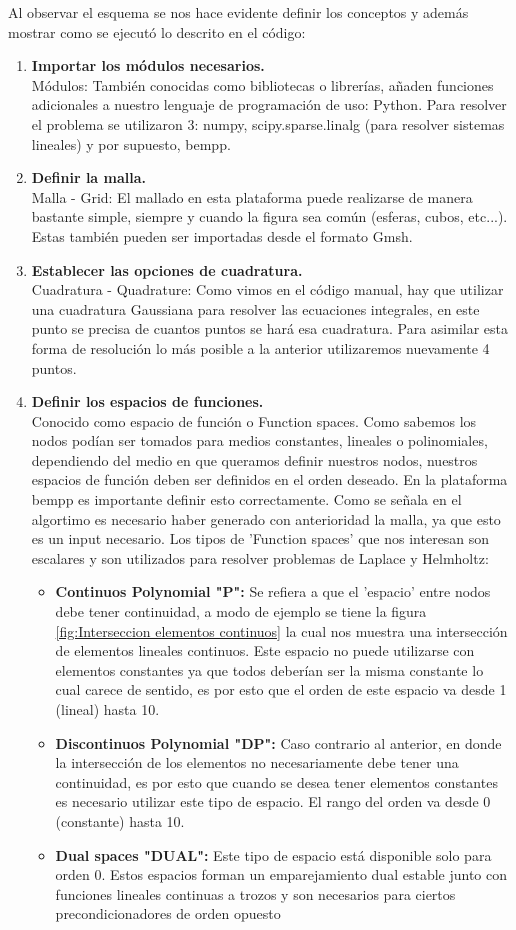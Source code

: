 Al observar el esquema se nos hace evidente definir los conceptos y además mostrar como se ejecutó lo descrito en el código:
\begin{enumerate}
\item \textbf{Importar los módulos necesarios.}\\
Módulos: También conocidas como bibliotecas o librerías, añaden funciones adicionales a nuestro lenguaje de programación de uso: Python. Para resolver el problema se utilizaron 3: numpy, scipy.sparse.linalg (para resolver sistemas lineales) y por supuesto, bempp.
\item \textbf{Definir la malla.}\\Malla - Grid: El mallado en esta plataforma puede realizarse de manera bastante simple, siempre y cuando la figura sea común (esferas, cubos, etc...). Estas también pueden ser importadas desde el formato Gmsh.
\item \textbf{Establecer las opciones de cuadratura.}\\Cuadratura - Quadrature: Como vimos en el código manual, hay que utilizar una cuadratura Gaussiana para resolver las ecuaciones integrales, en este punto se precisa de cuantos puntos se hará esa cuadratura. Para asimilar esta forma de resolución lo más posible a la anterior utilizaremos nuevamente 4 puntos.
\item \textbf{Definir los espacios de funciones.}\\Conocido como espacio de función o Function spaces. Como sabemos los nodos podían ser tomados para medios constantes, lineales o polinomiales, dependiendo del medio en que queramos definir nuestros nodos, nuestros espacios de función deben ser definidos en el orden deseado. En la plataforma bempp es importante definir esto correctamente. Como se señala en el algortimo es necesario haber generado con anterioridad la malla, ya que esto es un input necesario. Los tipos de 'Function spaces' que nos interesan son escalares y son utilizados para resolver problemas de Laplace y Helmholtz:
\begin{itemize}
\item \textbf{Continuos Polynomial "P": } Se refiera a que el 'espacio' entre nodos debe tener continuidad, a modo de ejemplo se tiene la figura \ref{fig:Interseccion elementos continuos} la cual nos muestra una intersección de elementos lineales continuos. Este espacio no puede utilizarse con elementos constantes ya que todos deberían ser la misma constante lo cual carece de sentido, es por esto que el orden de este espacio va desde 1 (lineal) hasta 10.
\item \textbf{Discontinuos Polynomial "DP": }Caso contrario al anterior, en donde la intersección de los elementos no necesariamente debe tener una continuidad, es por esto que cuando se desea tener elementos constantes es necesario utilizar este tipo de espacio. El rango del orden va desde 0 (constante) hasta 10.
\item \textbf{Dual spaces "DUAL": }Este tipo de espacio está disponible solo para orden 0. Estos	 espacios forman un emparejamiento dual estable junto con funciones lineales continuas a trozos y son necesarios para ciertos precondicionadores de orden opuesto
\end{itemize}


\end{enumerate}
